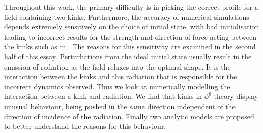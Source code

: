 \documentclass[11pt, oneside,titlepage]{article}  	%
\numberwithin{equation}{section}
\begin{document}
Throughout this work, the primary difficulty is in picking the correct profile for a field containing two kinks. Furthermore, the accuracy of numerical simulations depends extremely sensitively on the choice of initial state, with bad initialisation leading to incorrect results for the strength and direction of force acting between the kinks such as in \cite{belendryasova}. The reasons for this sensitivity are examined in the second half of this essay. Perturbations from the ideal initial state usually result in the emission of radiation as the field relaxes into the optimal shape. It is the interaction between the kinks and this radiation that is responsible for the incorrect dynamics observed. Thus we look at numerically modelling the interaction between a kink and radiation. We find that kinks in $\phi^8$ theory display unusual behaviour, being pushed in the same direction independent of the direction of incidence of the radiation. Finally two analytic models are proposed to better understand the reasons for this behaviour.
\end{document}
